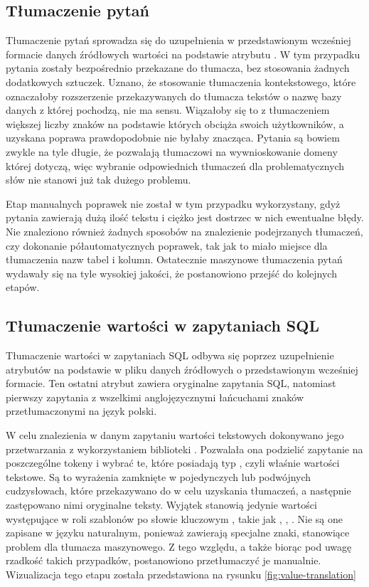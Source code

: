 \subsection{Tłumaczenie pytań}
Tłumaczenie pytań sprowadza się do uzupełnienia w przedstawionym wcześniej formacie danych źródłowych wartości  na podstawie atrybutu . W tym przypadku pytania zostały bezpośrednio przekazane do tłumacza, bez stosowania żadnych dodatkowych sztuczek. Uznano, że stosowanie tłumaczenia kontekstowego, które oznaczałoby rozszerzenie przekazywanych do tłumacza tekstów o nazwę bazy danych z której pochodzą, nie ma sensu. Wiązałoby się to z tłumaczeniem większej liczby znaków na podstawie których  obciąża swoich użytkowników, a uzyskana poprawa prawdopodobnie nie byłaby znacząca. Pytania są bowiem zwykle na tyle długie, że pozwalają tłumaczowi na wywnioskowanie domeny której dotyczą, więc wybranie odpowiednich tłumaczeń dla problematycznych słów nie stanowi już tak dużego problemu.

Etap manualnych poprawek nie został w tym przypadku wykorzystany, gdyż pytania zawierają dużą ilość tekstu i ciężko jest dostrzec w nich ewentualne błędy. Nie znaleziono również żadnych sposobów na znalezienie podejrzanych tłumaczeń, czy dokonanie półautomatycznych poprawek, tak jak to miało miejsce dla tłumaczenia nazw tabel i kolumn. Ostatecznie maszynowe tłumaczenia pytań wydawały się na tyle wysokiej jakości, że postanowiono przejść do kolejnych etapów.

\subsection{Tłumaczenie wartości w zapytaniach SQL}
Tłumaczenie wartości w zapytaniach SQL odbywa się poprzez uzupełnienie atrybutów  na podstawie  w pliku danych źródłowych o przedstawionym wcześniej formacie. Ten ostatni atrybut zawiera oryginalne zapytania SQL, natomiast pierwszy zapytania z wszelkimi anglojęzycznymi łańcuchami znaków przetłumaczonymi na język polski.

W celu znalezienia w danym zapytaniu wartości tekstowych dokonywano jego przetwarzania z wykorzystaniem biblioteki . Pozwalała ona podzielić zapytanie na poszczególne tokeny i wybrać te, które posiadają typ , czyli właśnie wartości tekstowe. Są to wyrażenia zamknięte w pojedynczych lub podwójnych cudzysłowach, które przekazywano do  w celu uzyskania tłumaczeń, a następnie zastępowano nimi oryginalne teksty. Wyjątek stanowią jedynie wartości występujące w roli szablonów po słowie kluczowym , takie jak , , . Nie są one zapisane w języku naturalnym, ponieważ zawierają specjalne znaki, stanowiące problem dla tłumacza maszynowego. Z tego względu, a także biorąc pod uwagę rzadkość takich przypadków, postanowiono przetłumaczyć je manualnie. Wizualizacja tego etapu została przedstawiona na rysunku \ref{fig:value-translation}

